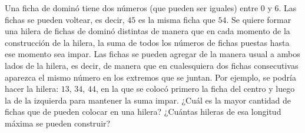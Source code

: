Una ficha de dominó tiene dos números (que pueden ser iguales) entre $0$ y $6$. Las fichas se pueden voltear, es decir, $\boxed 4\boxed 5$ es la misma ficha que $\boxed 5\boxed 4$. Se quiere formar una hilera de fichas de dominó distintas de manera que en cada momento de la construcción de la hilera, la suma de todos los números de fichas puestas hasta ese momento sea impar. Las fichas se pueden agregar de la manera usual a ambos lados de la hilera, es decir, de manera que en cualesquiera dos fichas consecutivas aparezca el mismo número en los extremos que se juntan. Por ejemplo, se podría hacer la hilera: $\boxed 1\boxed 3$, $\boxed 3\boxed 4$, $\boxed 4\boxed 4$, en la que se colocó primero la ficha del centro y luego la de la izquierda para mantener la suma impar.
¿Cuál es la mayor cantidad de fichas que de pueden colocar en una hilera?
¿Cuántas hileras de esa longitud máxima se pueden construir?